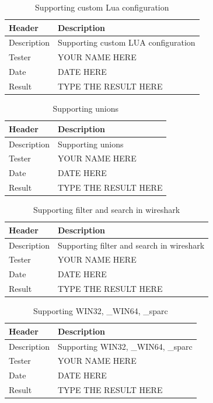\begin{table}[!htb] \footnotesize \center
\caption{Supporting custom Lua configuration\label{tab:sp3TID16}}
\begin{tabular}{l l}
	\toprule
	Header & Description \\
	\midrule
	Description & Supporting custom LUA configuration\\
	Tester & YOUR NAME HERE \\
	Date & DATE HERE \\
	Result & TYPE THE RESULT HERE\\
	\bottomrule
\end{tabular}
\end{table}

\begin{table}[!htb] \footnotesize \center
\caption{Supporting unions\label{tab:sp3TID17}}
\begin{tabular}{l l}
	\toprule
	Header & Description \\
	\midrule
	Description & Supporting unions\\
	Tester & YOUR NAME HERE\\
	Date & DATE HERE\\
	Result & TYPE THE RESULT HERE\\
	\bottomrule
\end{tabular}
\end{table}

\begin{table}[!htb] \footnotesize \center
\caption{Supporting filter and search in wireshark\label{tab:sp3TID18}}
\begin{tabular}{l l}
	\toprule
	Header & Description \\
	\midrule
	Description & Supporting filter and search in wireshark\\
	Tester & YOUR NAME HERE \\
	Date & DATE HERE\\
	Result & TYPE THE RESULT HERE\\
	\bottomrule
\end{tabular}
\end{table}

\begin{table}[!htb] \footnotesize \center
\caption{Supporting WIN32, \_WIN64, \_sparc \label{tab:sp3TID19}}
\begin{tabular}{l l}
	\toprule
	Header & Description \\
	\midrule
	Description & Supporting WIN32, \_WIN64, \_sparc \\
	Tester & YOUR NAME HERE\\
	Date & DATE HERE\\
	Result & TYPE THE RESULT HERE\\
	\bottomrule
\end{tabular}
\end{table}

